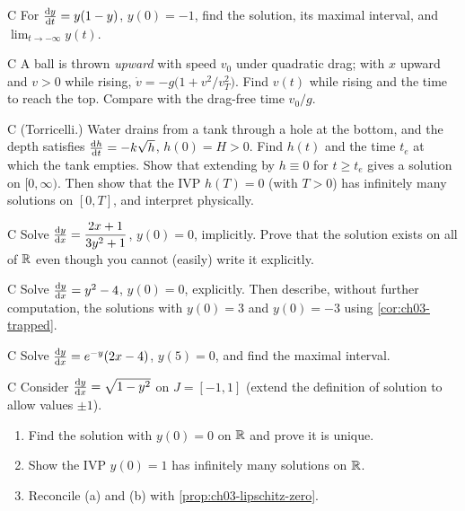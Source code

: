 \begin{problem}{C}\label{prob:ch03-c2}
For $\frac{\mathrm{d}y}{\mathrm{d}t} = y(1-y)$, $y(0) = -1$, find the solution, its maximal
interval, and $\lim_{t\to-\infty}y(t)$.
\end{problem}

\begin{problem}{C}\label{prob:ch03-c3}
A ball is thrown \emph{upward} with speed $v_0$ under quadratic drag; with $x$
upward and $v>0$ while rising, $\dot v = -g\bigl(1 + v^2/v_T^2\bigr)$. Find
$v(t)$ while rising and the time to reach the top. Compare with the
drag-free time $v_0/g$.
\end{problem}

\begin{problem}{C}\label{prob:ch03-c4}
(Torricelli.) Water drains from a tank through a hole at the bottom, and the
depth satisfies $\frac{\mathrm{d}h}{\mathrm{d}t} = -k\sqrt h$, $h(0) = H>0$. Find $h(t)$ and the time
$t_e$ at which the tank empties. Show that extending by $h\equiv0$ for $t\ge t_e$
gives a solution on $[0,\infty)$. Then show that the IVP $h(T) = 0$ (with
$T>0$) has infinitely many solutions on $[0,T]$, and interpret physically.
\end{problem}

\begin{problem}{C}\label{prob:ch03-c5}
Solve $\frac{\mathrm{d}y}{\mathrm{d}x} = \dfrac{2x + 1}{3y^2 + 1}$, $y(0) = 0$, implicitly. Prove that
the solution exists on all of $\mathbb{R}$ even though you cannot (easily) write it
explicitly.
\end{problem}

\begin{problem}{C}\label{prob:ch03-c6}
Solve $\frac{\mathrm{d}y}{\mathrm{d}x} = y^2 - 4$, $y(0) = 0$, explicitly. Then describe, without
further computation, the solutions with $y(0) = 3$ and $y(0) = -3$ using
\cref{cor:ch03-trapped}.
\end{problem}

\begin{problem}{C}\label{prob:ch03-c7}
Solve $\frac{\mathrm{d}y}{\mathrm{d}x} = e^{-y}(2x - 4)$, $y(5) = 0$, and find the maximal interval.
\end{problem}

\begin{problem}{C}\label{prob:ch03-c8}
Consider $\frac{\mathrm{d}y}{\mathrm{d}x} = \sqrt{1 - y^2}$ on $J = [-1,1]$ (extend the definition of
solution to allow values $\pm1$).
\begin{enumerate}[label=(\alph*)]
  \item Find the solution with $y(0) = 0$ on $\mathbb{R}$ and prove it is unique.
  \item Show the IVP $y(0) = 1$ has infinitely many solutions on $\mathbb{R}$.
  \item Reconcile (a) and (b) with \cref{prop:ch03-lipschitz-zero}.
\end{enumerate}
\end{problem}

